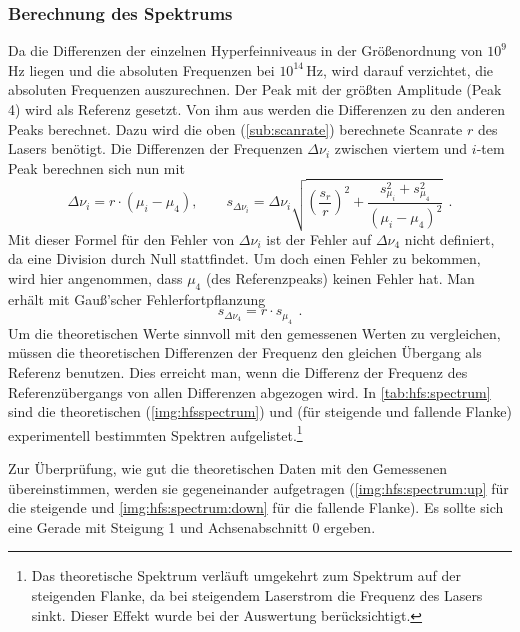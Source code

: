 \subsubsection*{Berechnung des Spektrums}
Da die Differenzen der einzelnen Hyperfeinniveaus in der Größenordnung von $10^9$\,Hz liegen und die absoluten Frequenzen bei $10^{14}$\,Hz, 
wird darauf verzichtet, die absoluten Frequenzen auszurechnen. Der Peak mit der größten Amplitude (Peak 4) wird als Referenz gesetzt. Von ihm aus werden 
die Differenzen zu den anderen Peaks berechnet. Dazu wird die oben (\autoref{sub:scanrate}) berechnete Scanrate $r$ des Lasers benötigt.
Die Differenzen der Frequenzen $\Delta \nu_i$ zwischen viertem und $i$-tem Peak berechnen sich nun mit
\begin{equation}
    \Delta \nu_i = r \cdot \left( \mu_i - \mu_4 \right), 
    \qquad s_{\Delta \nu_i} = \Delta \nu_i \sqrt{ \left( \frac{s_r}{r} \right)^2 + \frac{s_{\mu_i}^2 + s_{\mu_4}^2}{ \left( \mu_i - \mu_4 \right)^2 }} \ \, .
\end{equation}
Mit dieser Formel für den Fehler von $\Delta \nu_i$ ist der Fehler auf $\Delta \nu_4$ nicht definiert, da eine Division durch Null stattfindet.
Um doch einen Fehler zu bekommen, wird hier angenommen, dass $\mu_4$ (des Referenzpeaks) keinen Fehler hat. Man erhält mit Gauß'scher Fehlerfortpflanzung
\begin{equation}
    s_{\Delta \nu_4} = r \cdot s_{\mu_4} \ \, .
\end{equation}
Um die theoretischen Werte sinnvoll mit den gemessenen Werten zu vergleichen, müssen die theoretischen Differenzen der Frequenz den gleichen 
Übergang als Referenz benutzen. Dies erreicht man, wenn die Differenz der Frequenz des Referenzübergangs von allen Differenzen abgezogen wird.
In \autoref{tab:hfs:spectrum} sind die theoretischen (\autoref{img:hfsspectrum}) und (für steigende und fallende Flanke) 
experimentell bestimmten Spektren aufgelistet.\footnote{Das theoretische Spektrum verläuft umgekehrt zum Spektrum auf der steigenden Flanke, 
da bei steigendem Laserstrom die Frequenz des Lasers sinkt. Dieser Effekt wurde bei der Auswertung berücksichtigt.}   

Zur Überprüfung, wie gut die theoretischen Daten mit den Gemessenen übereinstimmen, werden sie gegeneinander aufgetragen 
(\autoref{img:hfs:spectrum:up} für die steigende und \autoref{img:hfs:spectrum:down} für die fallende Flanke). Es sollte sich 
eine Gerade mit Steigung 1 und Achsenabschnitt 0 ergeben.

